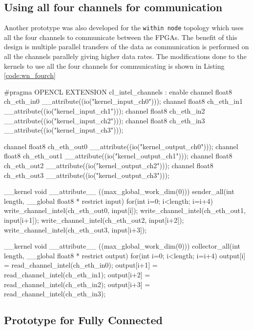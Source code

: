 \subsection*{Using all four channels for communication}

Another prototype was also developed for the \texttt{within node} topology which uses all the four channels
to communicate between the FPGAs. The benefit of this design is multiple parallel transfers of the data
as communication is performed on all the channels parallely giving higher data rates. The modifications
done to the kernels to use all the four channels for communicating is shown in Listing \ref{code:wn_fourch}

\begin{CppCode}[caption=Kernels for \texttt{within node} using four channels, frame=tlrb, label=code:wn_fourch, float]
#pragma OPENCL EXTENSION cl_intel_channels : enable
channel float8 ch_eth_in0 __attribute((io("kernel_input_ch0")));
channel float8 ch_eth_in1 __attribute((io("kernel_input_ch1")));
channel float8 ch_eth_in2 __attribute((io("kernel_input_ch2")));
channel float8 ch_eth_in3 __attribute((io("kernel_input_ch3")));

channel float8 ch_eth_out0 __attribute((io("kernel_output_ch0")));
channel float8 ch_eth_out1 __attribute((io("kernel_output_ch1")));
channel float8 ch_eth_out2 __attribute((io("kernel_output_ch2")));
channel float8 ch_eth_out3 __attribute((io("kernel_output_ch3")));

__kernel void __attribute__ ((max_global_work_dim(0)))
sender_all(int length, __global float8 * restrict input)
{
    for(int i=0; i<length; i=i+4)
    {
        write_channel_intel(ch_eth_out0, input[i]);
        write_channel_intel(ch_eth_out1, input[i+1]);
        write_channel_intel(ch_eth_out2, input[i+2]);
        write_channel_intel(ch_eth_out3, input[i+3]);
    }
}

__kernel void __attribute__ ((max_global_work_dim(0)))
collector_all(int length, __global float8 * restrict output)
{
    for(int i=0; i<length; i=i+4)
    {
        output[i] = read_channel_intel(ch_eth_in0);
        output[i+1] = read_channel_intel(ch_eth_in1);
        output[i+2] = read_channel_intel(ch_eth_in2);
        output[i+3] = read_channel_intel(ch_eth_in3);
    }
}
\end{CppCode}

\subsection{Prototype for Fully Connected}

